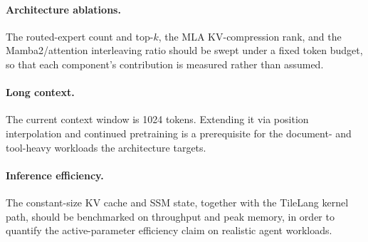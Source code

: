 \paragraph{Architecture ablations.}
The routed-expert count and top-$k$, the MLA KV-compression rank, and the
Mamba2/attention interleaving ratio should be swept under a fixed token budget, so that
each component's contribution is measured rather than assumed.

\paragraph{Long context.}
The current context window is 1024 tokens. Extending it via position interpolation and
continued pretraining is a prerequisite for the document- and tool-heavy workloads the
architecture targets.

\paragraph{Inference efficiency.}
The constant-size KV cache and SSM state, together with the TileLang kernel path, should
be benchmarked on throughput and peak memory, in order to quantify the active-parameter
efficiency claim on realistic agent workloads.
